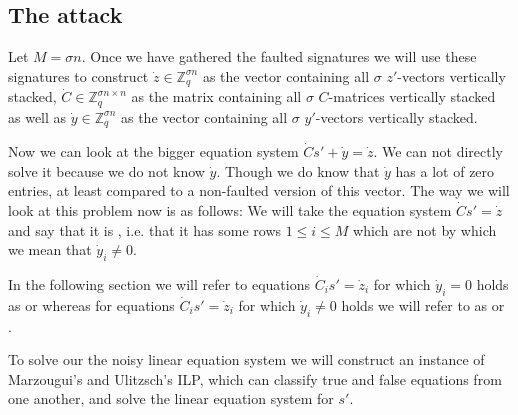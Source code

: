 
\subsection{The attack}
\label{sec:attackfinally}
Let $M = σn$. Once we have gathered the faulted signatures we will use these signatures to construct $\dot{z} \in \mathds{Z}_q^{σ n}$ as the vector containing all $σ$ $z'$-vectors vertically stacked, $\dot{C} \in \mathds{Z}_q^{σ n \times n}$ as the matrix containing all  $σ$ $C$-matrices vertically stacked as well as $\dot{y} \in \mathds{Z}_q^{σ n}$ as the vector containing all $σ$ $y'$-vectors vertically stacked.

Now we can look at the bigger equation system $\dot{C}s' + \dot{y} = \dot{z}$.
We can not directly solve it because we do not know $\dot{y}$. Though we do know that $\dot{y}$ has a lot of zero entries, at least compared to a non-faulted version of this vector. The way we will look at this problem now is as follows: We will take the equation system  $\dot{C}s' = \dot{z}$ and say that it is , i.e. that it has some rows $1 \leq i \leq M$ which are not  by which we mean that $\dot{y}_i \neq 0$.

In the following section we will refer to equations $\dot{C}_i s' = \dot{z}_i$ for which $\dot{y}_i = 0$ holds as  or  whereas for equations  $\dot{C}_i s' = \dot{z}_i$ for which $\dot{y}_i \neq 0$ holds we will refer to as  or . 

To solve our the noisy linear equation system we will construct an instance of Marzougui's and Ulitzsch's \cite[pp.~46-47]{ulitzsch} ILP, which can classify true and false equations from one another, and solve the linear equation system for $s'$.


